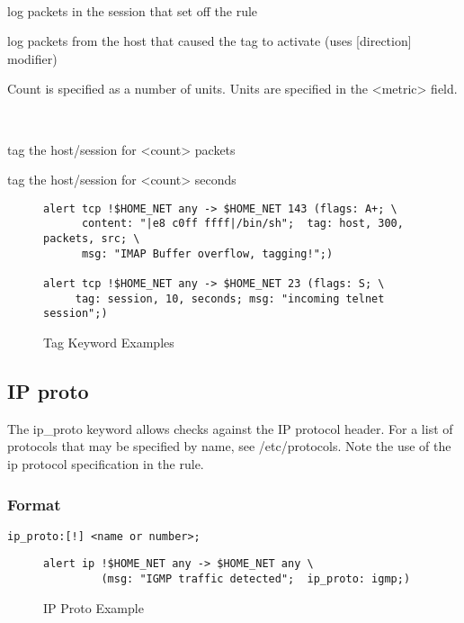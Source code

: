 \documentclass[english]{report}
\begin{document}
\begin{description}{}
  \item [type]~
     \begin{description}{}
     \item [session]log packets in the session that set off the rule 
     \item [host]log packets from the host that caused the tag to activate (uses {[}direction{]} modifier)
     \end{description}
  \item [count]Count is specified as a number of units. Units are specified in the <metric> field.
  \item [metric]~
  \begin{description}{}
      \item [packets]tag the host/session for <count> packets 
      \item [seconds]tag the host/session for <count> seconds
   \end{description}
\end{description}
%
\begin{figure}[!hbpt]
\begin{verbatim}
alert tcp !$HOME_NET any -> $HOME_NET 143 (flags: A+; \
      content: "|e8 c0ff ffff|/bin/sh";  tag: host, 300, packets, src; \
      msg: "IMAP Buffer overflow, tagging!";)

alert tcp !$HOME_NET any -> $HOME_NET 23 (flags: S; \
     tag: session, 10, seconds; msg: "incoming telnet session";)
\end{verbatim}

\caption{Tag Keyword Examples\label{tag keyword example}}
\end{figure}



\subsection{IP proto}

The ip\_proto keyword allows checks against the IP protocol header.
For a list of protocols that may be specified by name, see /etc/protocols.
Note the use of the ip protocol specification in the rule.


\subsubsection{Format}

\begin{verbatim}
ip_proto:[!] <name or number>;
\end{verbatim}
%
\begin{figure}[!hbpt]
\begin{verbatim}
alert ip !$HOME_NET any -> $HOME_NET any \
         (msg: "IGMP traffic detected";  ip_proto: igmp;)
\end{verbatim}

\caption{IP Proto Example\label{ip protocol example}}
\end{figure}
\end{document}
